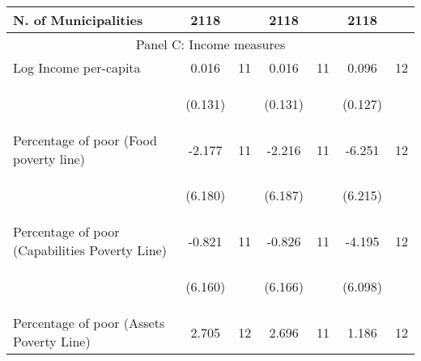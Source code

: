 \begin{tabular}{lcccccc}
N. of Municipalities  &   2118   &  &  2118    & &  2118  &    \\

\hline		

\multicolumn{7}{c}{Panel C: Income measures} \\

Log Income per-capita    &  0.016   &  11  &   0.016  &  11 &  0.096  &  12   \\

\vspace{4pt} &  \begin{footnotesize}(0.131)\end{footnotesize}   & &
			    \begin{footnotesize}(0.131)\end{footnotesize}   & &
			    \begin{footnotesize}(0.127)\end{footnotesize}   &
			     \\          


Percentage of poor (Food poverty line)     &  -2.177   &  11  &   -2.216  &  11 &  -6.251  &  12   \\

\vspace{4pt} &  \begin{footnotesize}(6.180)\end{footnotesize}   & &
			    \begin{footnotesize}(6.187)\end{footnotesize}   & &
			    \begin{footnotesize}(6.215)\end{footnotesize}   &
			     \\


Percentage of poor (Capabilities Poverty Line)     &  -0.821   &  11  &   -0.826  &  11 &  -4.195  &  12   \\

\vspace{4pt} &  \begin{footnotesize}(6.160)\end{footnotesize}   & &
			    \begin{footnotesize}(6.166)\end{footnotesize}   & &
			    \begin{footnotesize}(6.098)\end{footnotesize}   &
			     \\
 
Percentage of poor (Assets Poverty Line)    &  2.705   &  12  &   2.696  &  11 &  1.186  &  12   \\


\end{tabular}
